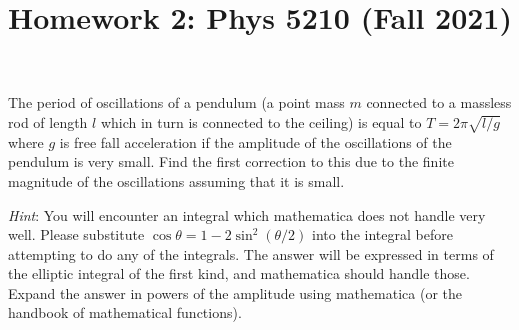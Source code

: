 \documentclass[12pt]{article}
\title{Homework 2: Phys 5210 (Fall 2021)}
\begin{document}
\maketitle

\begin{problem}{1}

The period of oscillations of a pendulum (a point mass $m$ connected to a
massless rod of length $l$ which in turn is connected to the ceiling) is equal
to $T=2\pi\sqrt{l/g}$ where $g$ is free fall acceleration if the amplitude of
the oscillations of the pendulum is very small. Find the first correction to
this due to the finite magnitude of the oscillations assuming that it is
small.

\textit{Hint}: You will encounter an integral which mathematica does not handle
very well. Please substitute $\cos\theta=1-2\sin^2(\theta/2)$ into the integral
before attempting to do any of the integrals. The answer will be expressed in
terms of the elliptic integral of the first kind, and mathematica should handle
those. Expand the answer in powers of the amplitude using mathematica (or the
handbook of mathematical functions).


\end{problem}
\end{document}
